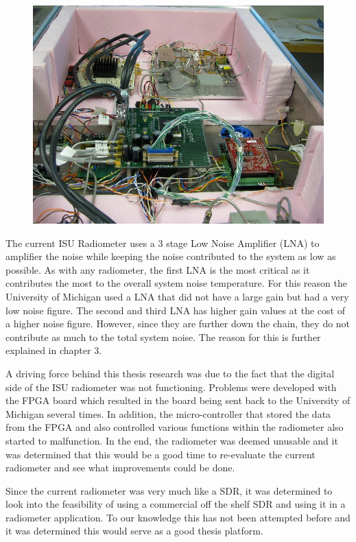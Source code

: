 {\begin{figure}[h!tb] 
\centering
\includegraphics{Images/IMG_0027}
\label{ISU_Rad}
\end{figure}
}
The current ISU Radiometer uses a 3 stage Low Noise Amplifier (LNA) to amplifier the noise while keeping the noise contributed to the system as low as possible.  As with any radiometer, the first LNA is the most critical as it contributes the most to the overall system noise temperature.  For this reason the University of Michigan used a LNA that did not have a large gain but had a very low noise figure. The second and third LNA has higher gain values at the cost of a higher noise figure.  However, since they are further down the chain, they do not contribute as much to the total system noise.  The reason for this is further explained in chapter 3.  

A driving force behind this thesis research was due to the fact that the digital side of the ISU radiometer was not functioning.  Problems were developed with the FPGA board which resulted in the board being sent back to the University of Michigan several times.  In addition, the micro-controller that stored the data from the FPGA and also controlled various functions within the radiometer also started to malfunction.  In the end, the radiometer was deemed unusable and it was determined that this would be a good time to re-evaluate the current radiometer and see what improvements could be done.  

Since the current radiometer was very much like a SDR, it was determined to look into the feasibility of using a commercial off the shelf SDR and using it in a radiometer application.  To our knowledge this has not been attempted before and it was determined this would serve as a good thesis platform.

